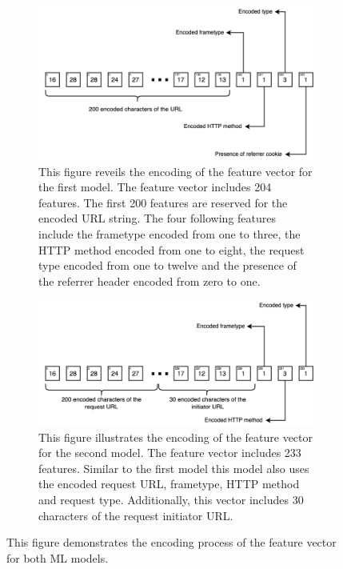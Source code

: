 \begin{figure}[ht!]  
  \centering
  \begin{subfigure}[b]{.47\textwidth}
      \centering
      \includegraphics[width=\linewidth ]{images/model1.png}
      \caption{This figure reveils the encoding of the feature vector for the first model. The feature vector includes 204 features. The first 200 features are reserved for the encoded URL
   string. The four following features include the frametype encoded from one to three, the HTTP method encoded from one to eight, the 
 request type encoded from one to twelve and the presence of the referrer header encoded from zero to one.}
      \label{fig:featModel1}
  \end{subfigure}
  \hfill
  \begin{subfigure}[b]{.47\textwidth}
      \centering
      \includegraphics[width=\linewidth, keepaspectratio]{images/model2.png}
      \caption{This figure illustrates the encoding of the feature vector for the second model. The feature vector includes 233 features. Similar to the 
        first model this model also uses the encoded request URL, frametype, HTTP method and request type. Additionally, this vector includes 30 characters
        of the request initiator URL.
      }
      \label{fig:featModel2}
  \end{subfigure}
  \label{}
  \caption{This figure demonstrates the encoding process of the feature vector for both ML models.}
\end{figure}  

